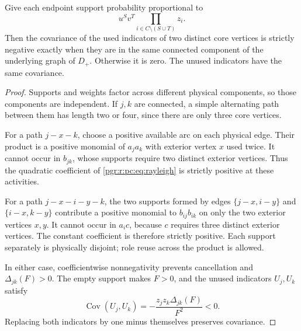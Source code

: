 \documentclass[11pt]{article}
\numberwithin{equation}{section}
\theoremstyle{definition}\newtheorem{definition}[theorem]{Definition}\newtheorem{remark}[theorem]{Remark}
\begin{document}
\begin{proposition}\label{pgr:r:pc:prop:strict}
Give each endpoint support probability proportional to
\[
 u^Sv^T\prod_{i\in C\setminus(S\cup T)}z_i.
\]
Then the covariance of the used
indicators of two distinct core vertices is strictly negative exactly when
they are in the same connected component of the underlying graph of $D_+$.
Otherwise it is zero. The unused indicators have the same covariance.
\end{proposition}
\begin{proof}
Supports and weights factor across different physical components, so those
components are independent. If $j,k$ are connected, a simple alternating
path between them has length two or four, since there are only three core
vertices.

For a path $j-x-k$, choose a positive available arc on each physical edge.
Their product is a positive monomial of $a_ja_k$ with exterior vertex $x$
used twice. It cannot occur in $b_{jk}$, whose supports require two distinct
exterior vertices. Thus the quadratic coefficient of \eqref{pgr:r:pc:eq:rayleigh}
is strictly positive at these activities.

For a path $j-x-i-y-k$, the two supports formed by edges
$\{j-x,i-y\}$ and $\{i-x,k-y\}$ contribute a positive monomial to
$b_{ij}b_{ik}$ on only the two exterior vertices $x,y$. It cannot occur in
$a_ic$, because $c$ requires three distinct exterior vertices. The constant
coefficient is therefore strictly positive. Each support separately is
physically disjoint; role reuse across the product is allowed.

In either case, coefficientwise nonnegativity prevents cancellation and
$\Delta_{jk}(F)>0$. The empty support makes $F>0$, and the unused indicators
$U_j,U_k$ satisfy
\[
 \operatorname{Cov}(U_j,U_k)=-\frac{z_jz_k\Delta_{jk}(F)}{F^2}<0.
\]
Replacing both indicators by one minus themselves preserves covariance.
\end{proof}
\end{document}
